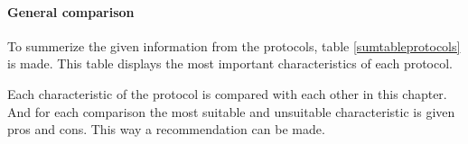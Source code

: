 \documentclass[10pt,a4paper]{article}
\begin{document}
\paragraph{General comparison}
To summerize the given information from the protocols, table \ref{sumtableprotocols} is made. This table displays the most important characteristics of each protocol.

\begin{table}[H]
\centering
\caption{A table with a summerazing of the protocols. The table is based on information from \cite{comparitivestudywirelessprotocols}. Infrared is not included due to the line of sight problem.}
\label{sumtableprotocols}
\end{table}

Each characteristic of the protocol is compared with each other in this chapter. And for each comparison the most suitable and unsuitable characteristic is given pros and cons. This way a recommendation can be made.\\
\end{document}
